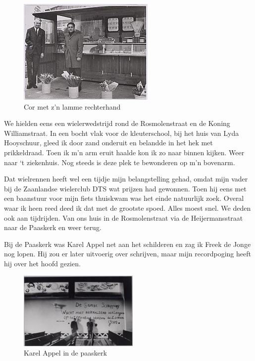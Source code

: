 \documentclass[12pt,twoside, openright]{memoir}
\begin{document}
\begin{figure}
\includegraphics[width=\textwidth]{img/ch12/knikker}
\caption*{\footnotesize Cor met z'n lamme rechterhand}
\end{figure}

We hielden eens een wielerwedstrijd rond de Rosmolenstraat en de Koning Williamstraat. In een bocht vlak voor de kleuterschool, bij het huis van Lyda Hooyschuur, gleed ik door zand onderuit en belandde in het hek met prikkeldraad. Toen ik m’n arm eruit haalde kon ik zo naar binnen kijken. Weer naar ‘t ziekenhuis. Nog steeds is deze plek te bewonderen op m’n bovenarm. 

Dat wielrennen heeft wel een tijdje mijn belangstelling gehad, omdat mijn vader bij de Zaanlandse wielerclub DTS wat prijzen had gewonnen. Toen hij eens met een baanstuur voor mijn fiets thuiskwam was het einde natuurlijk zoek. Overal waar ik heen reed deed ik dat met de grootste spoed. Alles moest snel. We deden ook aan tijdrijden. Van ons huis in de Rosmolenstraat via de Heijermansstraat naar de Paaskerk en weer terug.

Bij de Paaskerk was Karel Appel net aan het schilderen en zag ik Freek de Jonge nog lopen. Hij zou er later uitvoerig over schrijven, maar mijn recordpoging heeft hij over het hoofd gezien. 

\begin{figure}
\includegraphics[width=\textwidth]{img/ch12/paaskerk}
\caption*{\footnotesize Karel Appel in de paaskerk}
\end{figure}
\end{document}
